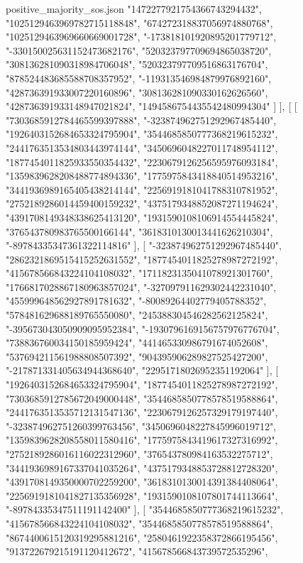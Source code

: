 \begin{filecontents*}[overwrite]{positive_majority_sos.json}
    "1472277921754366743294432",
    "1025129463969782715118848",
    "674272318837056974880768",
    "1025129463969660669001728",
    "-173818101920895201779712",
    "-330150025631152473682176",
    "520323797709694865038720",
    "308136281090318984706048",
    "520323797709516863176704",
    "878524483685588708357952",
    "-119313546984879976892160",
    "428736391933007220160896",
    "308136281090330162626560",
    "428736391933148947021824",
    "1494586754435542480994304"
   ]
  ],
  [
   [
    "7303685912784465599397888",
    "-323874962751292967485440",
    "1926403152684653324795904",
    "3544685850777368219615232",
    "2441763513534803443974144",
    "3450696048227011748954112",
    "1877454011825933550354432",
    "2230679126256595976093184",
    "1359839628208488774894336",
    "1775975843418840514953216",
    "3441936989165405438214144",
    "2256919181041788310781952",
    "2752189286014459400159232",
    "4375179348852087271194624",
    "4391708149348338625413120",
    "1931590108106914554445824",
    "376543780983765500166144",
    "3618310130013441626210304",
    "-89784335347361322114816"
   ],
   [
    "-323874962751292967485440",
    "2862321869515415252631552",
    "1877454011825278987272192",
    "415678566843224104108032",
    "1711823135041078921301760",
    "1766817028867180963857024",
    "-327097911629302442231040",
    "455999648562927891781632",
    "-80089264402779405788352",
    "578481629688189765550080",
    "245388304546282562125824",
    "-395673043050909095952384",
    "-1930796169156757976776704",
    "738836760034150185959424",
    "441465330986791674052608",
    "537694211561988808507392",
    "904395906289827525427200",
    "-217871331405634944368640",
    "22951718026952351192064"
   ],
   [
    "1926403152684653324795904",
    "1877454011825278987272192",
    "7303685912785672049000448",
    "3544685850778578519588864",
    "2441763513535712131547136",
    "2230679126257329179197440",
    "-323874962751260399763456",
    "3450696048227845996019712",
    "1359839628208558011580416",
    "1775975843419617327316992",
    "2752189286016116022312960",
    "376543780984163532275712",
    "3441936989167337041035264",
    "4375179348853728812728320",
    "4391708149350000702259200",
    "3618310130014391384408064",
    "2256919181041827135356928",
    "1931590108107801744113664",
    "-89784335347511191142400"
   ],
   [
    "3544685850777368219615232",
    "415678566843224104108032",
    "3544685850778578519588864",
    "8674400615120319295881216",
    "2580461922358372866195456",
    "913722679215191120412672",
    "415678566843739572535296",

\end{filecontents*}
